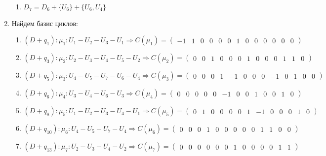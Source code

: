 \documentclass[a4paper, 12pt]{article}
\begin{document}
\begin{enumerate}
\begin{enumerate}[label*=\arabic*.]
        \item $ D_7 = D_6 + \{U_{ 6}\} + \{U_{ 6}, U_{ 4}\} $
    \end{enumerate}
    \item Найдем базис циклов:
    \begin{enumerate}[label*=\arabic*.]
        \item 
        $(D + q_1) : \mu_1 : U_1 - U_2 - U_3 - U_1 \Rightarrow C(\mu_1) = 
            \begin{pmatrix}
            -1 & 1 & 0 & 0 & 0 & 0 & 1 & 0 & 0 & 0 & 0 & 0 & 0
            \end{pmatrix} 
        $
        \item 
        $(D + q_3) : \mu_2 : U_2 - U_3 - U_4 - U_5 - U_2 \Rightarrow C(\mu_2) = 
            \begin{pmatrix}
            0 & 0 & 1 & 0 & 0 & 0 & 1 & 0 & 0 & 0 & 1 & 1 & 0
            \end{pmatrix} 
        $
        \item 
        $(D + q_5) : \mu_3 : U_4 - U_5 - U_7 - U_6 - U_4 \Rightarrow C(\mu_3) = 
            \begin{pmatrix}
            0 & 0 & 0 & 1 & -1 & 0 & 0 & 0 & -1 & 0 & 1 & 0 & 0
            \end{pmatrix} 
        $
        \item 
        $(D + q_6) : \mu_4 : U_3 - U_4 - U_6 - U_3 \Rightarrow C(\mu_4) = 
            \begin{pmatrix}
            0 & 0 & 0 & 0 & 0 & -1 & 0 & 0 & 1 & 0 & 0 & 1 & 0
            \end{pmatrix} 
        $
        \item 
        $(D + q_8) : \mu_5 : U_1 - U_2 - U_3 - U_4 - U_1 \Rightarrow C(\mu_5) = 
            \begin{pmatrix}
            0 & 1 & 0 & 0 & 0 & 0 & 1 & -1 & 0 & 0 & 0 & 1 & 0
            \end{pmatrix} 
        $
        \item 
        $(D + q_{10}) : \mu_6 : U_4 - U_5 - U_7 - U_4 \Rightarrow C(\mu_6) = 
            \begin{pmatrix}
            0 & 0 & 0 & 1 & 0 & 0 & 0 & 0 & 0 & 1 & 1 & 0 & 0
            \end{pmatrix} 
        $
        \item 
        $(D + q_{13}) : \mu_7 : U_2 - U_3 - U_4 - U_2 \Rightarrow C(\mu_7) = 
            \begin{pmatrix}
            0 & 0 & 0 & 0 & 0 & 0 & 1 & 0 & 0 & 0 & 0 & 1 & 1
            \end{pmatrix} 
        $
        

\end{enumerate}
\end{enumerate}
\end{document}
